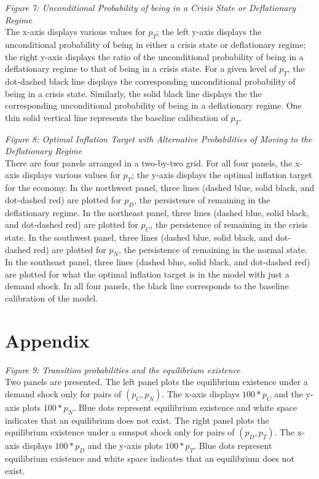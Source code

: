 \documentclass[11pt]{article}
\begin{document}
	\noindent \emph{Figure 7: Unconditional Probability of being in a Crisis State or Deflationary Regime}\\
	\noindent The x-axis displays various values for $p_T$; the left y-axis displays the unconditional probability of being in either a crisis state or deflationary regime; the right y-axis displays the ratio of the unconditional probability of being in a deflationary regime to that of being in a crisis state. For a given level of $p_T$, the dot-dashed black line displays the corresponding unconditional probability of being in a crisis state. Similarly, the solid black line displays the the corresponding unconditional probability of being in a deflationary regime. One thin solid vertical line represents the baseline calibration of $p_T$. \vspace{0.5cm}
	
	\noindent \emph{Figure 8: Optimal Inflation Target with Alternative Probabilities of Moving to the Deflationary Regime}\\
	\noindent There are four panels arranged in a two-by-two grid. For all four panels, the x-axis displays various values for $p_T$; the y-axis displays the optimal inflation target for the economy. In the northwest panel, three lines (dashed blue, solid black, and dot-dashed red) are plotted for $p_D$, the persistence of remaining in the deflationary regime. In the northeast panel, three lines (dashed blue, solid black, and dot-dashed red) are plotted for $p_C$, the persistence of remaining in the crisis state. In the southwest panel, three lines (dashed blue, solid black, and dot-dashed red) are plotted for $p_N$, the persistence of remaining in the normal state. In the southeast panel, three lines (dashed blue, solid black, and dot-dashed red) are plotted for what the optimal inflation target is in the model with just a demand shock. In all four panels, the black line corresponds to the baseline calibration of the model.  \vspace{0.5cm}
	
	\section*{Appendix}
	\noindent \emph{Figure 9: Transition probabilities and the equilibrium existence}\\
	\noindent Two panels are presented. The left panel plots the equilibrium existence under a demand shock only for pairs of $(p_C, p_N)$. The x-axis displays $100*p_C$ and the y-axis plots $100*p_N$. Blue dots represent equilibrium existence and white space indicates that an equilibrium does not exist. The right panel plots the equilibrium existence under a sunspot shock only for pairs of $(p_D, p_T)$. The x-axis displays $100*p_D$ and the y-axis plots $100*p_T$. Blue dots represent equilibrium existence and white space indicates that an equilibrium does not exist. \vspace{0.5cm}
	
\end{document}
